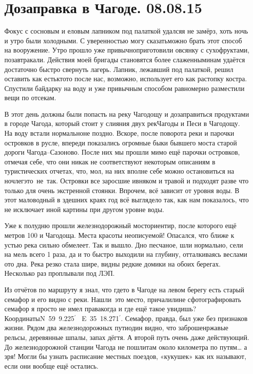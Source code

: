 \chapter{Дозаправка в Чагоде. 08.08.15}

Фокус с сосновым и еловым лапником под палаткой удался\mdash я не замёрз, хоть ночь и утро были холодными. С уверенностью могу сказать\mdash можно брать этот способ на вооружение. Утро прошло уже привычно\mdash приготовили овсянку с сухофруктами, позавтракали. Действия моей бригады становятся более слаженными\mdash нам удаётся достаточно быстро свернуть лагерь. Лапник, лежавший под палаткой, решил оставить как есть\mdash кто\sdash то после нас, возможно, использует его как растопку костра. Спустили байдарку на воду и уже привычным  способом равномерно разместили вещи по отсекам. 

В этот день должны были попасть на реку Чагодощу и дозаправиться продуктами в городе Чагода, который стоит у слияния двух рек\mdash Чагоды и Песи в Чагодощу. На воду встали нормально\mdash не поздно. Вскоре, после поворота реки и парочки островков в русле, впереди показались огромные быки бывшего моста старой дороги Чагода\nobreakdash--Сазоново. После них мы прошли мимо ещё парочки островков, отмечая себе, что они никак не соответствуют некоторым описаниям в туристических отчетах, что, мол, на них вполне себе можно остановиться на ночлег\mdash это~не~так. Островки все заросшие ивняком и травой и подходят разве что только для очень экстренной стоянки. Впрочем, всё зависит от уровня воды. В этот маловодный в здешних краях год всё выглядело так, как нам показалось, что не исключает иной картины при другом уровне воды. 

Уже к полудню прошли железнодорожный мост\mdash ориентир, после которого ещё метров 100 и Чагодоща. Места красоты неописуемой! Опасался, что ближе к устью река сильно обмелеет. Так и вышло. Дно песчаное, шли нормально, сели на мель всего 1 раза, да и то быстро выходили на глубину, отталкиваясь веслами ото дна. Река резко стала шире, видны редкие домики на обоих берегах. Несколько раз проплывали под ЛЭП. 

Из отчётов по маршруту я знал, что где\sdash то в Чагоде на левом берегу есть старый семафор и его видно с реки. Нашли~это место, причалили\mdash не сфотографировать семафор я просто не имел права\mdash когда и где ещё такое увидишь? Координаты\mdash N~59\degree~9.225$^\prime$~ E~35\degree~18.271$^\prime$. Семафор, правда, был уже без признаков жизни. Рядом два железнодорожных пути\mdash один видно, что заброшен\mdash ржавые рельсы, деревянные шпалы, запах дёгтя. А второй путь очень даже действующий. До железнодорожной станции Чагода не пошли\mdash там около километра по путям… а зря! Могли бы узнать расписание местных поездов, «кукушек» как их называют, если они вообще ещё остались. 

